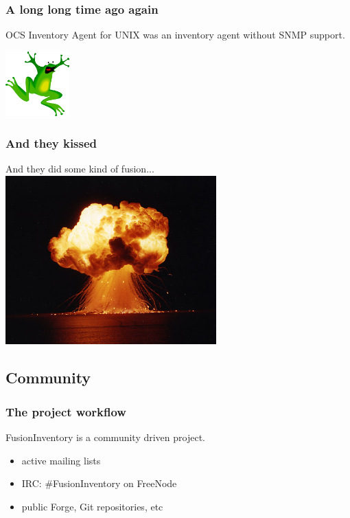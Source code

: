 \documentclass{beamer}
\begin{document}
\begin{frame}
    \frametitle{A long long time ago again}
    
    OCS Inventory Agent for UNIX was an inventory agent without SNMP support.

    \includegraphics[height=2.5cm]{./pics/frog2.pdf}
\end{frame}

\begin{frame}
    \frametitle{And they kissed}
    
    And they did some kind of fusion...
    \includegraphics[height=6.5cm]{./pics/explode.jpg}
\end{frame}


\subsection{Community}

\begin{frame}
    \frametitle{The project workflow}
    FusionInventory is a community driven project.

    \begin{itemize}
        \item active mailing lists
        \item IRC: \#FusionInventory on FreeNode
        \item public Forge, Git repositories, etc
    \end{itemize}
\end{frame}
\end{document}
